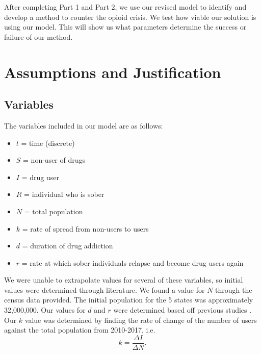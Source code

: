 \documentclass[12pt, letterpaper]{article}
\begin{document}

After completing Part 1 and Part 2, we use our revised model to identify and develop a method to counter the opioid crisis. We test how viable our solution is using our model. This will show us what parameters determine the success or failure of our method. 

\section{Assumptions and Justification}
\subsection{Variables}
The variables included in our model are as follows:
    \begin{itemize}
        \item $t$ = time (discrete)
        \item $S$ = non-user of drugs
        \item $I$ = drug user
        \item $R$ = individual who is sober
        \item $N$ = total population
        \item $k$ = rate of spread from non-users to users
        \item $d$ = duration of drug addiction
        \item $r$ = rate at which sober individuals relapse and become drug users again
    \end{itemize}

We were unable to extrapolate values for several of these variables, so initial values were determined through literature. We found a value for $N$ through the census data provided. The initial population for the 5 states was approximately 32,000,000. Our values for $d$ and $r$ were determined based off previous studies \cite{relapse} \citep{length}. Our $k$ value was determined by finding the rate of change of the number of users against the total population from 2010-2017, i.e.
    \begin{equation}
        k = \frac{\Delta I}{\Delta N}.
    \end{equation}
\end{document}

